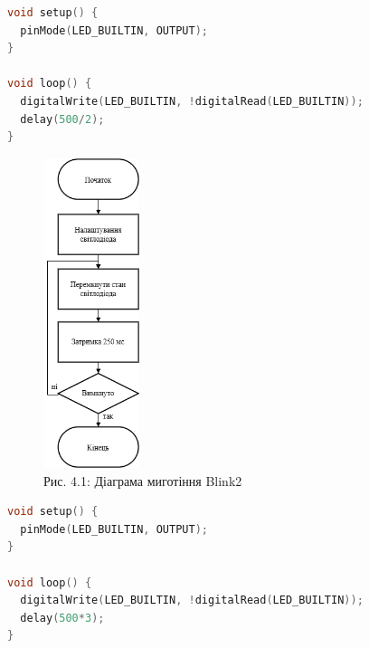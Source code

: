 \documentclass[a4paper]{article}
\begin{document}
\begin{lstlisting}[language=C++, caption=Програма Blink2 - вбудований світлодіод миготить у 2 рази швидше]
void setup() {
  pinMode(LED_BUILTIN, OUTPUT);
}

void loop() {
  digitalWrite(LED_BUILTIN, !digitalRead(LED_BUILTIN));
  delay(500/2);
}
\end{lstlisting}

\begin{figure}[h]
    \centering
    \includegraphics[width=0.25\textwidth]{imgs/LW4.0.1.drawio.png}
    \caption*{Рис. 4.1: Діаграма миготіння Blink2}
\end{figure} 

\newpage 

\begin{lstlisting}[language=C++, caption=Програма Blink3 - вбудований світлодіод миготить у 3 рази повільніше]
void setup() {
  pinMode(LED_BUILTIN, OUTPUT);
}

void loop() {
  digitalWrite(LED_BUILTIN, !digitalRead(LED_BUILTIN));
  delay(500*3);
}
\end{lstlisting}
\end{document}
